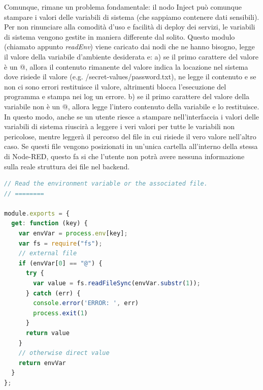 \documentclass[a4paper,10pt]{memoir}
\begin{document}
Comunque, rimane un problema fondamentale: il nodo Inject può comunque stampare i valori delle variabili di sistema (che sappiamo contenere dati sensibili).
Per non rinunciare alla comodità d'uso e facilità di deploy dei servizi, le variabili di sistema vengono gestite in maniera differente dal solito.
Questo modulo (chiamato appunto \textit{readEnv}) viene caricato dai nodi che ne hanno bisogno, legge il valore della variabile d'ambiente desiderata e: a) se il primo carattere del valore è un @, allora il contenuto rimanente del valore indica la locazione nel sistema dove risiede il valore (e.g. /secret-values/password.txt), ne legge il contenuto e se non ci sono errori restituisce il valore, altrimenti blocca l'esecuzione del programma e stampa nei log un errore. b) se il primo carattere del valore della variabile non è un @, allora legge l'intero contenuto della variabile e lo restituisce.
In questo modo, anche se un utente riesce a stampare nell'interfaccia i valori delle variabili di sistema riuscirà a leggere i veri valori per tutte le variabili non pericolose, mentre leggerà il percorso del file in cui risiede il vero valore nell'altro caso.
Se questi file vengono posizionati in un'unica cartella all'interno della stessa di Node-RED, questo fa si che l'utente non potrà avere nessuna informazione sulla reale struttura dei file nel backend.
\begin{lstlisting}[language=Javascript]
// Read the environment variable or the associated file.
// ========

module.exports = {
  get: function (key) {
    var envVar = process.env[key];
    var fs = require("fs");
    // external file
    if (envVar[0] == "@") {
      try {
        var value = fs.readFileSync(envVar.substr(1));
      } catch (err) {
        console.error('ERROR: ', err)
        process.exit(1)
      }
      return value
    }
    // otherwise direct value
    return envVar
  }
};

\end{lstlisting}
\end{document}

